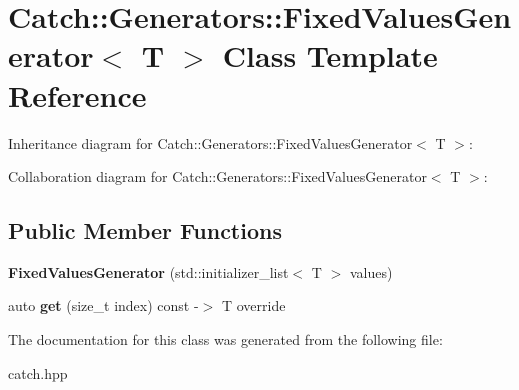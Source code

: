 \hypertarget{classCatch_1_1Generators_1_1FixedValuesGenerator}{}\section{Catch\+:\+:Generators\+:\+:Fixed\+Values\+Generator$<$ T $>$ Class Template Reference}
\label{classCatch_1_1Generators_1_1FixedValuesGenerator}


Inheritance diagram for Catch\+:\+:Generators\+:\+:Fixed\+Values\+Generator$<$ T $>$\+:


Collaboration diagram for Catch\+:\+:Generators\+:\+:Fixed\+Values\+Generator$<$ T $>$\+:
\subsection*{Public Member Functions}
\begin{DoxyCompactItemize}
\item 
{\bfseries Fixed\+Values\+Generator} (std\+::initializer\+\_\+list$<$ T $>$ values)\hypertarget{classCatch_1_1Generators_1_1FixedValuesGenerator_a6e9f473655413c1cb15f079890f06b86}{}\label{classCatch_1_1Generators_1_1FixedValuesGenerator_a6e9f473655413c1cb15f079890f06b86}

\item 
auto {\bfseries get} (size\+\_\+t index) const -\/$>$ T override\hypertarget{classCatch_1_1Generators_1_1FixedValuesGenerator_a3ed654a5860c170dbe7b01487b83253d}{}\label{classCatch_1_1Generators_1_1FixedValuesGenerator_a3ed654a5860c170dbe7b01487b83253d}

\end{DoxyCompactItemize}


The documentation for this class was generated from the following file\+:\begin{DoxyCompactItemize}
\item 
catch.\+hpp\end{DoxyCompactItemize}
